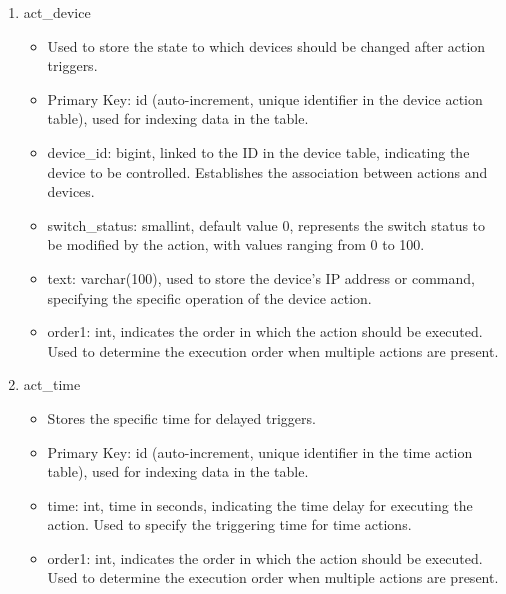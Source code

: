 \begin{enumerate}
\begin{enumerate}
                        \item act\_device
                              \begin{itemize}
                                  \item Used to store the state to which devices should be changed after action triggers.
                                  \item Primary Key: id (auto-increment, unique identifier in the device action table), used for indexing data in the table.
                                  \item device\_id: bigint, linked to the ID in the device table, indicating the device to be controlled. Establishes the association between actions and devices.
                                  \item switch\_status: smallint, default value 0, represents the switch status to be modified by the action, with values ranging from 0 to 100.
                                  \item text: varchar(100), used to store the device's IP address or command, specifying the specific operation of the device action.
                                  \item order1: int, indicates the order in which the action should be executed. Used to determine the execution order when multiple actions are present.\\
                              \end{itemize}

                        \item act\_time
                              \begin{itemize}
                                  \item Stores the specific time for delayed triggers.
                                  \item Primary Key: id (auto-increment, unique identifier in the time action table), used for indexing data in the table.
                                  \item time: int, time in seconds, indicating the time delay for executing the action. Used to specify the triggering time for time actions.
                                  \item order1: int, indicates the order in which the action should be executed. Used to determine the execution order when multiple actions are present.\\
                              \end{itemize}


\end{enumerate}
\end{enumerate}
